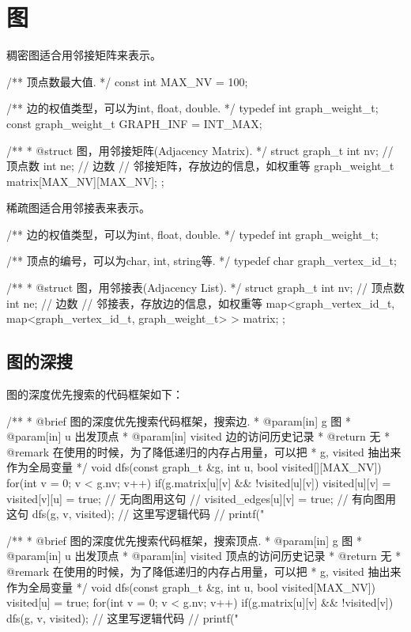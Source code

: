 \chapter{图}
稠密图适合用邻接矩阵来表示。
\begin{Codex}[label=am_graph.cpp]
/** 顶点数最大值. */
const int MAX_NV = 100;

/** 边的权值类型，可以为int, float, double. */
typedef int graph_weight_t;
const graph_weight_t GRAPH_INF = INT_MAX;

/**
 * @struct 图，用邻接矩阵(Adjacency Matrix).
 */
struct graph_t {
    int nv; // 顶点数
    int ne; // 边数
    // 邻接矩阵，存放边的信息，如权重等
    graph_weight_t matrix[MAX_NV][MAX_NV];
};
\end{Codex}

稀疏图适合用邻接表来表示。
\begin{Codex}[label=al_graph.cpp]
/** 边的权值类型，可以为int, float, double. */
typedef int graph_weight_t;

/** 顶点的编号，可以为char, int, string等. */
typedef char graph_vertex_id_t;

/**
 * @struct 图，用邻接表(Adjacency List).
 */
struct graph_t {
    int nv; // 顶点数
    int ne; // 边数
    // 邻接表，存放边的信息，如权重等
    map<graph_vertex_id_t, map<graph_vertex_id_t, graph_weight_t> > matrix;
};
\end{Codex}


\section{图的深搜} %

图的深度优先搜索的代码框架如下：

\begin{Codex}[label=graph_dfs.cpp]
/**
 * @brief 图的深度优先搜索代码框架，搜索边.
 * @param[in] g 图
 * @param[in] u 出发顶点
 * @param[in] visited 边的访问历史记录
 * @return 无
 * @remark 在使用的时候，为了降低递归的内存占用量，可以把
 * g, visited 抽出来作为全局变量
 */
void dfs(const graph_t &g, int u, bool visited[][MAX_NV]) {
    for(int v = 0;  v < g.nv; v++) if(g.matrix[u][v] && !visited[u][v]) {
        visited[u][v] = visited[v][u] = true; // 无向图用这句
        // visited_edges[u][v] = true; // 有向图用这句
        dfs(g, v, visited);
        // 这里写逻辑代码
        // printf("%
    }
}

/**
 * @brief 图的深度优先搜索代码框架，搜索顶点.
 * @param[in] g 图
 * @param[in] u 出发顶点
 * @param[in] visited 顶点的访问历史记录
 * @return 无
 * @remark 在使用的时候，为了降低递归的内存占用量，可以把
 * g, visited 抽出来作为全局变量
 */
void dfs(const graph_t &g, int u, bool visited[MAX_NV]) {
    visited[u] = true;
    for(int v = 0;  v < g.nv; v++) if(g.matrix[u][v] && !visited[v]) {
        dfs(g, v, visited);
        // 这里写逻辑代码
        // printf("%
    }
}
\end{Codex}


